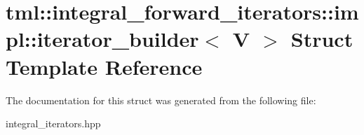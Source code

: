 \hypertarget{structtml_1_1integral__forward__iterators_1_1impl_1_1iterator__builder}{\section{tml\+:\+:integral\+\_\+forward\+\_\+iterators\+:\+:impl\+:\+:iterator\+\_\+builder$<$ V $>$ Struct Template Reference}
\label{structtml_1_1integral__forward__iterators_1_1impl_1_1iterator__builder}
}


The documentation for this struct was generated from the following file\+:\begin{DoxyCompactItemize}
\item 
integral\+\_\+iterators.\+hpp\end{DoxyCompactItemize}
